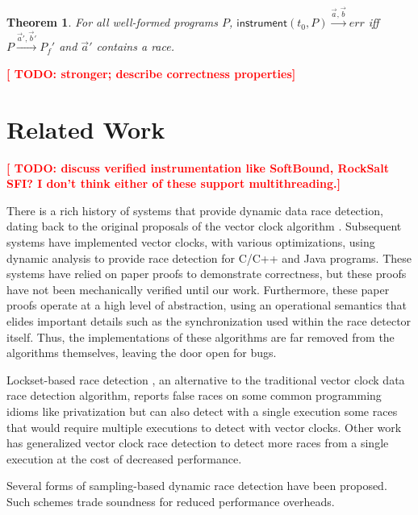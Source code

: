 \documentclass[preprint, 10pt]{sigplanconf}
\newcommand{\TODO}[1]{\textbf{\textcolor{red}{[ TODO: #1]}}}
\newcommand{\instr}[2]{\ensuremath{\mathsf{instrument}(#1, #2)}}
\newtheorem{theorem}{Theorem}
\begin{document}
\begin{theorem}\label{race}For all well-formed programs $P$, $\instr{t_0}{P} \xrightarrow{\vec{a}, \vec{b}} \mathit{err}$ iff $P \xrightarrow{\vec{a}', \vec{b}'} P_f'$ and $\vec{a}'$ contains a race.\end{theorem}

\TODO{stronger; describe correctness properties}

\section{Related Work}
\label{related}

\TODO{discuss verified instrumentation like SoftBound, RockSalt SFI? I don't think either of these support multithreading.}

There is a rich history of systems that provide dynamic data race detection, dating back to the original proposals of the vector clock algorithm \cite{friedmann,mattern,lamportvc}. Subsequent systems have implemented vector clocks, with various optimizations, using dynamic analysis to provide race detection for C/C++ \cite{pozniansky_efficient_2003,serebryany_threadsanitizer:_2009} and Java \cite{christiaens_trade:_2001,elmas_goldilocks:_2007,flanagan_fasttrack:_2009,flanagan_fasttrack:_2010,slimstate} programs. These systems have relied on paper proofs to demonstrate correctness, but these proofs have not been mechanically verified until our work. Furthermore, these paper proofs operate at a high level of abstraction, using an operational semantics that elides important details such as the synchronization used within the race detector itself. Thus, the implementations of these algorithms are far removed from the algorithms themselves, leaving the door open for bugs.

Lockset-based race detection \cite{dinning_detecting_1991,savage_eraser:_1997}, an alternative to the traditional vector clock data race detection algorithm, reports false races on some common programming idioms like privatization but can also detect with a single execution some races that would require multiple executions to detect with vector clocks. Other work has generalized vector clock race detection to detect more races from a single execution \cite{smaragdakis_sound_2012,sen_detecting_2005,chen_parametric_2007} at the cost of decreased performance.

Several forms of sampling-based dynamic race detection have been proposed. Such schemes trade soundness \cite{greathouse_demand-driven_2011,bond_pacer:_2010,marino_literace:_2009,erickson_effective_2010,effinger-dean_ifrit:_2012} for reduced performance overheads.
\end{document}
